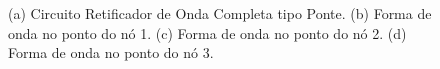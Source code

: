 \documentclass[a4paper]{article} %
\begin{document}
\begin{figure}[h!]
\begin{centering}
\subfloat[]{

 \label{fig:ret-circ2(a)}
}
\par\end{centering}

\caption{(a) Circuito Retificador de Onda Completa tipo Ponte. (b) Forma de onda
no ponto do nó 1. (c) Forma de onda no ponto do nó 2. (d) Forma de onda no ponto do nó 3. \label{fig:ret-circ2}}
\end{figure}
\end{document}
